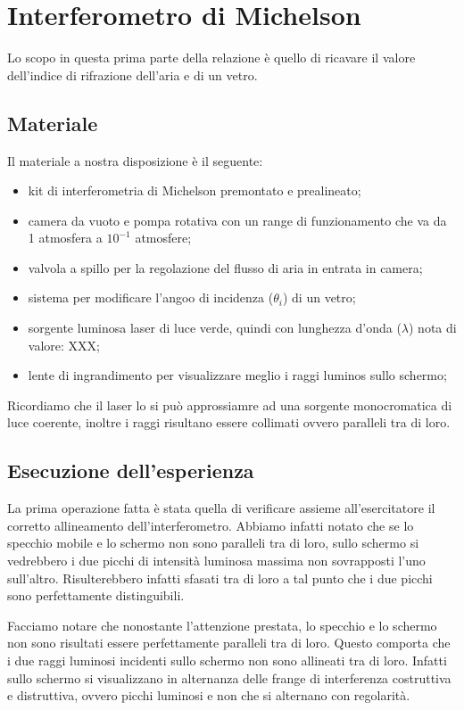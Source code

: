 \section{Interferometro di Michelson}

Lo scopo in questa prima parte della relazione è quello di ricavare il valore dell'indice di rifrazione dell'aria e di un vetro.

\subsection{Materiale}
Il materiale a nostra disposizione è il seguente:
\begin{itemize}
	\item{kit di interferometria di Michelson premontato e prealineato;}
    \item{camera da vuoto e pompa rotativa con un range di funzionamento che va da 1 atmosfera a $10^{-1}$ atmosfere;}
	\item{valvola a spillo per la regolazione del flusso di aria in entrata in camera;}
	\item{sistema per modificare l'angoo di incidenza ($\theta_i$) di un vetro;}
	\item{sorgente luminosa laser di luce verde, quindi con lunghezza d'onda ($\lambda$) nota di valore: XXX;}
	\item{lente di ingrandimento per visualizzare meglio i raggi luminos sullo schermo;}
\end{itemize}
Ricordiamo che il laser lo si può approssiamre ad una sorgente monocromatica di luce coerente, inoltre i raggi risultano essere collimati ovvero paralleli tra di loro.

\subsection{Esecuzione dell'esperienza}
La prima operazione fatta è stata quella di verificare assieme all'esercitatore il corretto allineamento dell'interferometro. Abbiamo infatti notato che se lo specchio mobile e lo schermo non sono paralleli tra di loro, sullo schermo si vedrebbero i due picchi di intensità luminosa massima non sovrapposti l'uno sull'altro. Risulterebbero infatti sfasati tra di loro a tal punto che i due picchi sono perfettamente distinguibili.

Facciamo notare che nonostante l'attenzione prestata, lo specchio e lo schermo non sono risultati essere perfettamente paralleli tra di loro. Questo comporta che i due raggi luminosi incidenti sullo schermo non sono allineati tra di loro. Infatti sullo schermo si visualizzano in alternanza delle frange di interferenza costruttiva e distruttiva, ovvero picchi luminosi e non che si alternano con regolarità.

